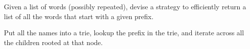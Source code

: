 \begin{blocksection}
\question Given a list of words (possibly repeated), devise a strategy to
efficiently return a list of all the words that start with a given prefix.

\begin{solution}[1.5in]
Put all the names into a trie, lookup the prefix in the trie, and iterate
across all the children rooted at that node.
\end{solution}
\end{blocksection}
